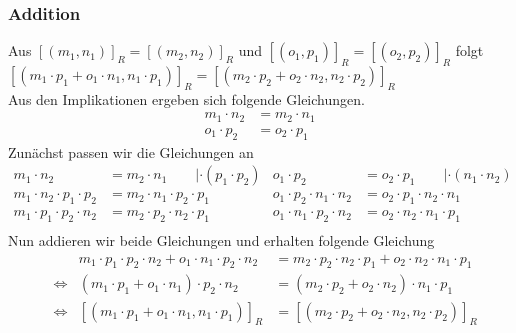 \documentclass[18pt, 4paper]{article}
\begin{document}
\subsubsection*{Addition}
Aus $[(m_1,n_1)]_R = [(m_2,n_2)]_R$ und $[(o_1,p_1)]_R = [(o_2,p_2)]_R$ folgt $[(m_1 \cdot p_1+o_1 \cdot n_1,n_1 \cdot p_1)]_R = [(m_2 \cdot p_2+ o_2 \cdot n_2,n_2 \cdot p_2)]_R$\\
Aus den Implikationen ergeben sich folgende Gleichungen.
\begin{align}
	m_1 \cdot n_2 &= m_2 \cdot n_1\\
	o_1 \cdot p_2 &= o_2 \cdot p_1
\end{align}
Zunächst passen wir die Gleichungen an
\begin{align*}
	m_1 \cdot n_2 &= m_2 \cdot n_1\qquad| \cdot(p_1\cdot p_2)&o_1 \cdot p_2 &= o_2 \cdot p_1\qquad| \cdot(n_1\cdot n_2)\\
	m_1 \cdot n_2 \cdot p_1\cdot p_2&= m_2 \cdot n_1\cdot p_2\cdot p_1&o_1 \cdot p_2 \cdot n_1\cdot n_2&= o_2 \cdot p_1\cdot n_2\cdot n_1\\
	m_1 \cdot p_1 \cdot p_2\cdot n_2&= m_2 \cdot p_2\cdot n_2\cdot p_1&o_1 \cdot n_1 \cdot p_2\cdot n_2&= o_2 \cdot n_2\cdot n_1\cdot p_1\\
\end{align*}
Nun addieren wir beide Gleichungen und erhalten folgende Gleichung
\begin{align*}
	&&m_1 \cdot p_1 \cdot p_2\cdot n_2 + o_1 \cdot n_1 \cdot p_2\cdot n_2 &= m_2 \cdot p_2\cdot n_2\cdot p_1 +  o_2 \cdot n_2\cdot n_1\cdot p_1\\
	&\Leftrightarrow& (m_1 \cdot p_1 + o_1 \cdot n_1) \cdot p_2\cdot n_2 &= (m_2 \cdot p_2 +  o_2 \cdot n_2) \cdot n_1\cdot p_1\\
	&\Leftrightarrow&	[(m_1 \cdot p_1+o_1 \cdot n_1,n_1 \cdot p_1)]_R &= [(m_2 \cdot p_2+ o_2 \cdot n_2,n_2 \cdot p_2)]_R
\end{align*}
\end{document}
